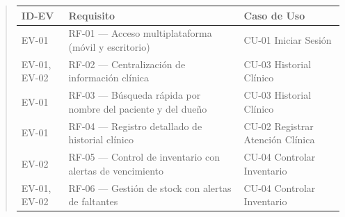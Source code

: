 \documentclass[
]{article}
\newcounter{none} %
\begin{document}
\begin{quote}
{\def\LTcaptype{none} %
\begin{longtable}[]{|
  >{\raggedright\arraybackslash}p{}|
  >{\raggedright\arraybackslash}p{}|
  >{\raggedright\arraybackslash}p{}|}
\hline
\begin{minipage}[b]{\linewidth}\raggedright
\textbf{ID-EV}
\end{minipage} & \begin{minipage}[b]{\linewidth}\raggedright
\textbf{Requisito}
\end{minipage} & \begin{minipage}[b]{\linewidth}\raggedright
\textbf{Caso de Uso}
\end{minipage} \\
\hline
\endhead
\hline
\endlastfoot
EV-01 & \begin{minipage}[t]{\linewidth}\raggedright
RF-01 --- Acceso multiplataforma (móvil y escritorio)
\end{minipage} & CU-01 Iniciar Sesión \\
\hline
EV-01, EV-02 & \begin{minipage}[t]{\linewidth}\raggedright
RF-02 --- Centralización de información clínica
\end{minipage} & CU-03 Historial Clínico \\
\hline
EV-01 & \begin{minipage}[t]{\linewidth}\raggedright
RF-03 --- Búsqueda rápida por nombre del paciente y del dueño
\end{minipage} & CU-03 Historial Clínico \\
\hline
EV-01 & \begin{minipage}[t]{\linewidth}\raggedright
RF-04 --- Registro detallado de historial clínico
\end{minipage} & CU-02 Registrar Atención Clínica \\
\hline
EV-02 & \begin{minipage}[t]{\linewidth}\raggedright
RF-05 --- Control de inventario con alertas de vencimiento
\end{minipage} & CU-04 Controlar Inventario \\
\hline
EV-01, EV-02 & \begin{minipage}[t]{\linewidth}\raggedright
RF-06 --- Gestión de stock con alertas de faltantes
\end{minipage} & CU-04 Controlar Inventario \\
\hline

\end{longtable}}
\end{quote}
\end{document}
